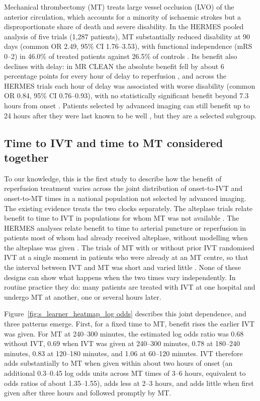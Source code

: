 Mechanical thrombectomy (MT) treats large vessel occlusion (LVO) of the anterior circulation, which accounts for a minority of ischaemic strokes but a disproportionate share of death and severe disability. In the HERMES pooled analysis of five trials (1{,}287 patients), MT substantially reduced disability at 90 days (common OR 2.49, 95\% CI 1.76--3.53), with functional independence (mRS 0--2) in 46.0\% of treated patients against 26.5\% of controls . Its benefit also declines with delay: in MR CLEAN the absolute benefit fell by about 6 percentage points for every hour of delay to reperfusion , and across the HERMES trials each hour of delay was associated with worse disability (common OR 0.84, 95\% CI 0.76--0.93), with no statistically significant benefit beyond 7.3 hours from onset . Patients selected by advanced imaging can still benefit up to 24 hours after they were last known to be well , but they are a selected subgroup.

\subsection{Time to IVT and time to MT considered together}

To our knowledge, this is the first study to describe how the benefit of reperfusion treatment varies across the joint distribution of onset-to-IVT and onset-to-MT times in a national population not selected by advanced imaging. The existing evidence treats the two clocks separately. The alteplase trials relate benefit to time to IVT in populations for whom MT was not available . The HERMES analyses relate benefit to time to arterial puncture or reperfusion in patients most of whom had already received alteplase, without modelling when the alteplase was given . The trials of MT with or without prior IVT randomised IVT at a single moment in patients who were already at an MT centre, so that the interval between IVT and MT was short and varied little . None of these designs can show what happens when the two times vary independently. In routine practice they do: many patients are treated with IVT at one hospital and undergo MT at another, one or several hours later.

Figure~\ref{fig:s_learner_heatmap_log odds} describes this joint dependence, and three patterns emerge. First, for a fixed time to MT, benefit rises the earlier IVT was given. For MT at 240--300 minutes, the estimated log odds ratio was 0.68 without IVT, 0.69 when IVT was given at 240--300 minutes, 0.78 at 180--240 minutes, 0.83 at 120--180 minutes, and 1.06 at 60--120 minutes. IVT therefore adds substantially to MT when given within about two hours of onset (an additional 0.3--0.45 log odds units across MT times of 3--6 hours, equivalent to odds ratios of about 1.35--1.55), adds less at 2--3 hours, and adds little when first given after three hours and followed promptly by MT.

